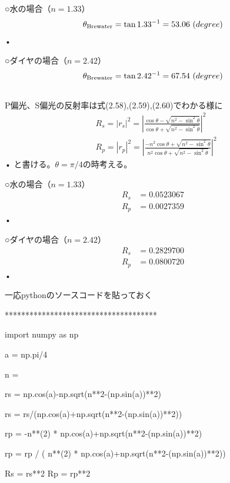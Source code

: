 \documentclass{jsarticle}
\begin{document}
\subsection{}
○水の場合（$n = 1.33$）
\begin{align}
\theta_{\rm{Brewater}} = \tan{1.33}^{-1} = 53.06 \ (degree)
\end{align}•

○ダイヤの場合（$n = 2.42$）
\begin{align}
\theta_{\rm{Brewater}} = \tan{2.42}^{-1} = 67.54
 \ (degree)
\end{align}


\subsection{}
P偏光、S偏光の反射率は式(2.58),(2.59),(2.60)でわかる様に
\begin{align}
&R_s = \left|r_s \right|^{2}= \left|\frac{\cos{\theta} - \sqrt{n^2-\sin^2{\theta}}}{\cos{\theta} + \sqrt{n^2-\sin^2{\theta}}} \right|^2 \\
&R_p = \left|r_p \right|^{2}= \left|\frac{-n^2\cos{\theta} + \sqrt{n^2-\sin^2{\theta}}}{n^2\cos{\theta} + \sqrt{n^2-\sin^2{\theta}}} \right| ^2
\end{align}•
と書ける。$\theta = \pi/4$の時考える。


○水の場合（$n=1.33$）
\begin{align}
R_s &= 0.0523067 \\
R_p &= 0.0027359
\end{align}•


○ダイヤの場合（$n = 2.42$）
\begin{align}
R_s &= 0.2829700 \\
R_p &= 0.0800720
\end{align}•

一応pythonのソースコードを貼っておく

*************************************

import numpy as np

a = np.pi/4

n = 

rs = np.cos(a)-np.sqrt(n**2-(np.sin(a))**2)

rs = rs/(np.cos(a)+np.sqrt(n**2-(np.sin(a))**2))

rp =  -n**(2) * np.cos(a)+np.sqrt(n**2-(np.sin(a))**2)

rp = rp / ( n**(2) * np.cos(a)+np.sqrt(n**2-(np.sin(a))**2))

Rs = rs**2
Rp = rp**2
\end{document}
